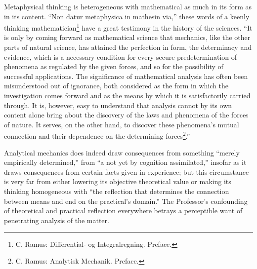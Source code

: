 \documentclass[12pt]{book}
\newcommand{\opage}[1]{\marginnote{\footnotesize\textit{[#1]}}}
\begin{document}
Metaphysical thinking is heterogeneous with mathematical as much in its
form as in its content. ``Non datur metaphysica in mathesin via,'' these
words of a keenly thinking mathematician\footnote{%
C. Ramus: Differential- og Integralregning. Preface.} have a great
testimony in the history of the sciences. ``It is only by coming forward
as mathematical science that mechanics, like the other parts of natural
science, has attained the perfection in form, the determinacy and
evidence, which is a necessary condition for every secure
predetermination of phenomena as regulated by the given forces, and so
for the possibility of successful applications. The significance of
mathematical analysis has often been misunderstood out of ignorance, both
considered as the form in which the investigation comes forward and as
the means by which it is satisfactorily carried through. It is, however,
easy to understand that analysis cannot by its own content alone bring
about the discovery of the laws and phenomena of the forces of nature. It
serves, on the other hand, to discover these phenomena's mutual
connection and their dependence on the determining
forces\footnote{C. Ramus: Analytisk Mechanik. Preface.}.''

Analytical mechanics does indeed draw consequences from something
``merely empirically determined,'' from ``a not yet by cognition
assimilated,'' insofar as it draws consequences from certain facts given
in experience; but this circumstance is very far from either lowering its
objective theoretical value or making its
\opage{26}\setcounter{footnote}{0}%
thinking homogeneous with ``the reflection that determines the connection
between means and end on the practical's domain.'' The Professor's
confounding of theoretical and practical reflection everywhere betrays a
perceptible want of penetrating analysis of the matter.
\end{document}
